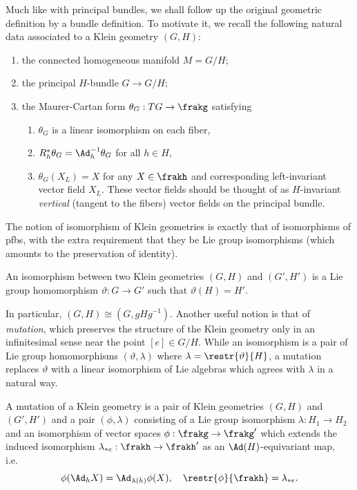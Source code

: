 Much like with principal bundles, we shall follow up the original geometric definition by a bundle definition. To motivate it, we recall the following natural data associated to a Klein geometry $(G,H)$:
\begin{enumerate}[label=(\alph*)]
    \item the connected homogeneous manifold $M=G\slash H$;
    \item the principal $H$-bundle $G\to G\slash H$;
    \item the Maurer-Cartan form $\theta_G:TG\to \frakg$ satisfying
    \begin{enumerate}[label=(\roman*)]
        \item $\theta_G$ is a linear isomorphism on each fiber,
        \item $R_h^\ast \theta_G=\Ad_h^{-1}\theta_G$ for all $h\in H$,
        \item $\theta_G(X_L)=X$ for any $X\in \frakh$ and corresponding left-invariant vector field $X_L$. These vector fields should be thought of as $H$-invariant \emph{vertical} (tangent to the fibers) vector fields on the principal bundle.
    \end{enumerate}
\end{enumerate}

The notion of isomorphism of Klein geometries is exactly that of isomorphisms of \glspl{pfb}, with the extra requirement that they be Lie group isomorphisms (which amounts to the preservation of identity).



\begin{defn}
    An isomorphism between two Klein geometries $(G,H)$ and $(G',H')$ is a Lie group homomorphism $\vartheta:G\to G'$ such that $\vartheta(H)=H'$.
\end{defn}

In particular, $(G,H)\cong (G,gHg^{-1})$. Another useful notion is that of \emph{mutation}, which preserves  the structure of the Klein geometry only in an infinitesimal sense near the point $[e]\in G\slash H$. While an isomorphism is a pair of Lie group homomorphisms $(\vartheta,\lambda)$ where $\lambda=\restr{\vartheta}{H}$, a mutation replaces $\vartheta$ with a linear isomorphism of Lie algebras which agrees with $\lambda$ in a natural way.

\begin{defn}
    A mutation of a Klein geometry is a pair of Klein geometries $(G,H)$ and $(G',H')$ and a pair $(\phi,\lambda)$ consisting of a Lie group isomorphism $\lambda:H_1\to H_2$ and an isomorphism of vector spaces $\phi:\frakg\to \frakg'$ which extends the induced isomorphism $\lambda_{\ast e}:\frakh\to\frakh'$ as an $\Ad(H)$-equivariant map, i.e.\ 
    \[\phi(\Ad_h X)=\Ad_{\lambda(h)}\phi(X), \quad \restr{\phi}{\frakh}=\lambda_{\ast e}.\]
\end{defn}


